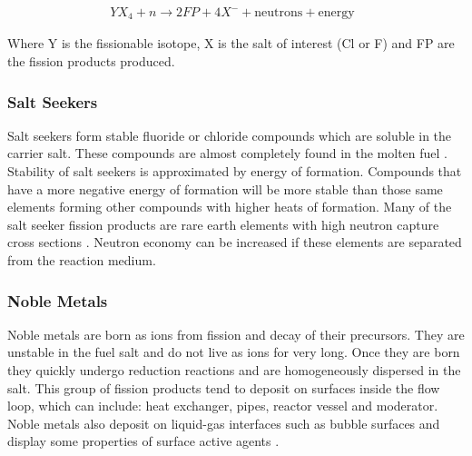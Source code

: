 \begin{align}
	\ YX_{4} + n  \rightarrow 2FP + 4X^{-}  + \text{neutrons} + \text{energy}
	& \label{eq:fission_reaction}
\end{align}

Where Y is the fissionable isotope, X is the salt of interest (Cl or F) and FP are the fission products produced.

\subsubsection{Salt Seekers}
Salt seekers form stable fluoride or chloride compounds which are soluble in the carrier salt. These compounds are almost completely found in the molten fuel \cite{grimes1970}. Stability of salt seekers is approximated by energy of formation. Compounds that have a more negative energy of formation will be more stable than those same elements forming other compounds with higher heats of formation. Many of the salt seeker fission products are rare earth elements with high neutron capture cross sections \cite{baes1974}. Neutron economy can be increased if these elements are separated from the reaction medium.  

\subsubsection{Noble Metals}
Noble metals are born as ions from fission and decay of their precursors. They are unstable in the fuel salt and do not live as ions for very long. Once they are born they quickly undergo reduction reactions and are homogeneously dispersed in the salt. This group of fission products tend to deposit on surfaces inside the flow loop, which can include: heat exchanger, pipes, reactor vessel and moderator. Noble metals also deposit on liquid-gas interfaces such as bubble surfaces and display some properties of surface active agents \cite{kedl1972}. 

\newpage

